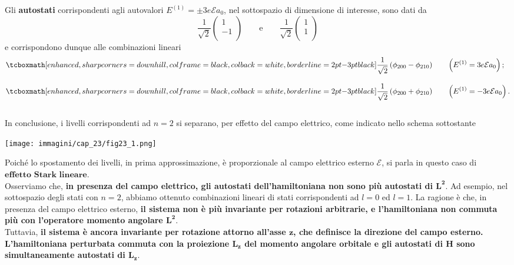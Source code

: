 Gli \textbf{autostati} corrispondenti agli autovalori $E^{(1)}=\pm 3e\mathcal{E}a_0$, nel sottospazio di dimensione  di interesse, sono dati da
	\begin{equation} 
		\frac{1}{\sqrt{2}} 
		\begin{pmatrix}
		1 \\
		-1 \\
		\end{pmatrix}
		\qquad \textrm{e} \qquad 
		\frac{1}{\sqrt{2}}
		\begin{pmatrix}
		1 \\
		1 \\
		\end{pmatrix}
	\end{equation}
e corrispondono dunque alle combinazioni lineari 
\begin{align}
& \tcboxmath[enhanced, sharp corners=downhill, colframe=black, colback=white, borderline={2pt}{-3pt}{black}]{
\frac{1}{\sqrt{2}} \left( \phi_{200}-\phi_{210} \right) 
} \qquad 
\left( E^{(1)}=3e\mathcal{E}a_0 \right) ;\\[0.3cm]
&\tcboxmath[enhanced, sharp corners=downhill, colframe=black, colback=white, borderline={2pt}{-3pt}{black}]{
\frac{1}{\sqrt{2}} \left( \phi_{200}+\phi_{210} \right)
}\qquad
\left( E^{(1)}=-3e\mathcal{E}a_0 \right) .
\end{align}\\

In conclusione, i livelli corrispondenti ad $n=2$ si separano, per effetto del campo elettrico, come indicato nello schema sottostante
\begin{center}
\texttt{[image: immagini/cap\_23/fig23\_1.png]}
\end{center}
Poiché lo spostamento dei livelli, in prima approssimazione, è proporzionale al campo elettrico esterno $\mathcal{E}$, si parla in questo caso di $\textbf{effetto Stark lineare}$.\\

Osserviamo che, \textbf{in presenza del campo elettrico, gli autostati dell'hamiltoniana non sono più autostati di $\boldsymbol{L^2}$}. Ad esempio, nel sottospazio degli stati con $n=2$, abbiamo ottenuto combinazioni lineari di stati corrispondenti ad $l=0$ ed $l=1$. La ragione è che, in presenza del campo elettrico esterno, \textbf{il sistema non è più invariante per rotazioni arbitrarie, e l'hamiltoniana non commuta più con l'operatore momento angolare $\boldsymbol{L^2}$}.\\
Tuttavia, \textbf{il sistema è ancora invariante per rotazione attorno all'asse $\boldsymbol{z}$, che definisce la direzione del campo esterno. L'hamiltoniana perturbata commuta con la proiezione $\boldsymbol{L_z}$ del momento angolare orbitale e gli autostati di $\boldsymbol{H}$ sono simultaneamente autostati di $\boldsymbol{L_z}$}.
